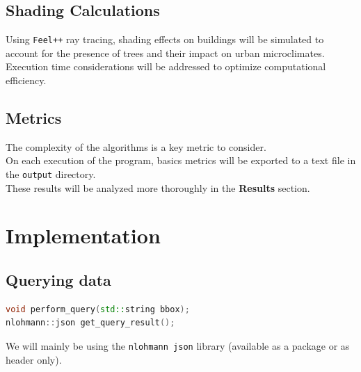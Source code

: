 \documentclass[12pt]{article}
\begin{document}
\subsection{Shading Calculations}
Using \texttt{Feel++} ray tracing, shading effects on buildings will be simulated to account for the presence
of trees and their impact on urban microclimates. Execution time considerations will be
addressed to optimize computational efficiency.

\subsection{Metrics}
The complexity of the algorithms is a key metric to consider. \\
On each execution of the program, basics metrics will be exported to a text file in 
the \texttt{output} directory. \\
These results will be analyzed more thoroughly in the \textbf{Results} section.

\section{Implementation}

\subsection{Querying data}
\begin{lstlisting}[language=C++]
void perform_query(std::string bbox);
nlohmann::json get_query_result();
\end{lstlisting}

We will mainly be using the \texttt{nlohmann json} library (available as a package or as 
header only).
\end{document}
